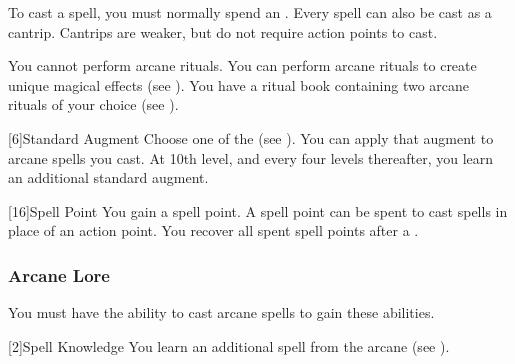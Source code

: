             To cast a spell, you must normally spend an .
            Every spell can also be cast as a cantrip.
            Cantrips are weaker, but do not require action points to cast.

             You cannot perform arcane rituals.
             You can perform arcane rituals to create unique magical effects (see ).
            You have a ritual book containing two arcane rituals of your choice (see ).

            [6]{Standard Augment}
            Choose one of the  (see ).
            You can apply that augment to arcane spells you cast.
            At 10th level, and every four levels thereafter, you learn an additional standard augment.

            [16]{Spell Point}
            You gain a spell point.
            A spell point can be spent to cast spells in place of an action point.
            You recover all spent spell points after a .

        \subsubsection{Arcane Lore}
            You must have the ability to cast arcane spells to gain these abilities.

            [2]{Spell Knowledge} 
            You learn an additional spell from the arcane  (see ).

